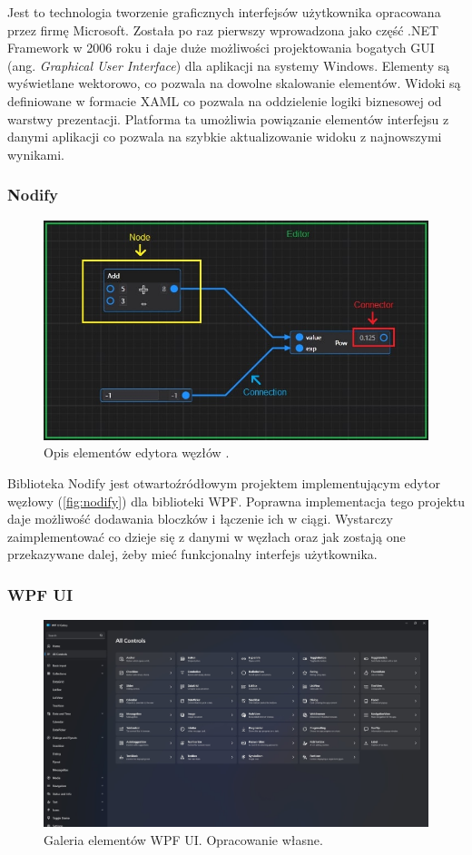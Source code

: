Jest to technologia tworzenie graficznych interfejsów użytkownika opracowana przez firmę Microsoft. 
Została po raz pierwszy wprowadzona jako część .NET Framework w 2006 roku \cite{wpfHistory} i daje duże możliwości projektowania bogatych GUI (ang. \textit{Graphical User Interface}) dla aplikacji na systemy Windows.
Elementy są wyświetlane wektorowo, co pozwala na dowolne skalowanie elementów. 
Widoki są definiowane w formacie XAML co pozwala na oddzielenie logiki biznesowej od warstwy prezentacji.
Platforma ta umożliwia powiązanie elementów interfejsu z danymi aplikacji co pozwala na szybkie aktualizowanie widoku z najnowszymi wynikami.

\subsubsection{Nodify}
\begin{figure}[H]
    \centering
    \includegraphics[width=0.8\linewidth]{./images/Picture7.jpg}
    \caption{Opis elementów edytora węzłów \cite{node}.}
    \label{fig:nodify}
\end{figure}

Biblioteka Nodify \cite{nodify} jest otwartoźródłowym projektem implementującym edytor węzłowy (\autoref{fig:nodify}) dla biblioteki WPF. 
Poprawna implementacja tego projektu daje możliwość dodawania bloczków i łączenie ich w ciągi. 
Wystarczy zaimplementować co dzieje się z danymi w węzłach oraz jak zostają one przekazywane dalej, żeby mieć funkcjonalny interfejs użytkownika. 

\subsubsection{WPF UI}
\begin{figure}[H]
    \centering
    \includegraphics[width=0.9\linewidth]{./images/Picture8.jpg}
    \caption{Galeria elementów WPF UI. Opracowanie własne.}
    \label{fig:wpfui}
\end{figure}

